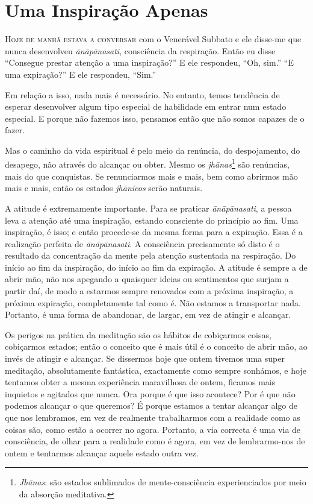 \chapter{Uma Inspiração Apenas}

\lettrine{H}{oje de manhã estava a conversar} com o Venerável Subbato e ele disse-me que
nunca desenvolveu \emph{ānāpānasati}, consciência da respiração. Então eu disse
``Consegue prestar atenção a uma inspiração?'' E ele respondeu, ``Oh, sim.'' ``E
uma expiração?'' E ele respondeu, ``Sim.''

Em relação a isso, nada mais é necessário. No entanto, temos tendência de
esperar desenvolver algum tipo especial de habilidade em entrar num estado
especial. E porque não fazemos isso, pensamos então que não somos capazes de o
fazer.

Mas o caminho da vida espiritual é pelo meio da renúncia, do despojamento, do
desapego, não através do alcançar ou obter. Mesmo os
\emph{jhānas}\footnote{\emph{Jhānas}: são estados sublimados de
  mente-consciência experienciados por meio da absorção meditativa.} são
renúncias, mais do que conquistas. Se renunciarmos mais e mais, bem como
abrirmos mão mais e mais, então os estados \emph{jhānicos} serão naturais.

A atitude é extremamente importante. Para se praticar \emph{ānāpānasati}, a
pessoa leva a atenção até uma inspiração, estando consciente do princípio ao
fim. Uma inspiração, é isso; e então procede-se da mesma forma para a expiração.
Essa é a realização perfeita de \emph{ānāpānasati}. A consciência precisamente
só disto é o resultado da concentração da mente pela atenção sustentada na
respiração. Do início ao fim da inspiração, do início ao fim da expiração. A
atitude é sempre a de abrir mão, não nos apegando a quaisquer ideias ou
sentimentos que surjam a partir daí, de modo a estarmos sempre renovados com a
próxima inspiração, a próxima expiração, completamente tal como é. Não estamos a
transportar nada. Portanto, é uma forma de abandonar, de largar, em vez de
atingir e alcançar.

Os perigos na prática da meditação são os hábitos de cobiçarmos coisas,
cobiçarmos estados; então o conceito que é mais útil é o conceito de abrir mão,
ao invés de atingir e alcançar. Se dissermos hoje que ontem tivemos uma super
meditação, absolutamente fantástica, exactamente como sempre sonhámos, e hoje
tentamos obter a mesma experiência maravilhosa de ontem, ficamos mais inquietos
e agitados que nunca. Ora porque é que isso acontece? Por é que não podemos
alcançar o que queremos? É porque estamos a tentar alcançar algo de que nos
lembramos, em vez de realmente trabalharmos com a realidade como as coisas são,
como estão a ocorrer no agora. Portanto, a via correcta é uma via de
consciência, de olhar para a realidade como é agora, em vez de lembrarmo-nos de
ontem e tentarmos alcançar aquele estado outra vez.

